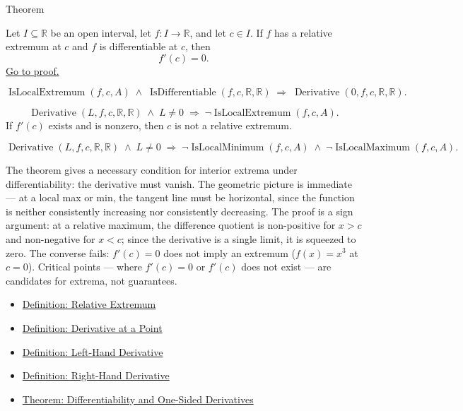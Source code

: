 
\begin{theorembox}{Theorem}
\begin{theorem}
\label{thm:interior-extremum-theorem}
Let $I \subseteq \mathbb{R}$ be an open interval, let $f : I \to \mathbb{R}$, and let $c \in I$.
If $f$ has a relative extremum at $c$ and $f$ is differentiable at $c$, then
\[
f'(c) = 0.
\]
\hyperref[prf:interior-extremum-theorem]{Go to proof.}
\end{theorem}
\end{theorembox}

\begin{remark*}
\[
\operatorname{IsLocalExtremum}(f,c,A) \;\land\; \operatorname{IsDifferentiable}(f,c,\mathbb{R},\mathbb{R})
\;\Rightarrow\; \operatorname{Derivative}(0,f,c,\mathbb{R},\mathbb{R}).
\]
\end{remark*}

\begin{remark*}[Interpretation]
\[
\operatorname{Derivative}(L,f,c,\mathbb{R},\mathbb{R}) \;\land\; L \neq 0
\;\Rightarrow\; \lnot\operatorname{IsLocalExtremum}(f,c,A).
\]
If $f'(c)$ exists and is nonzero, then $c$ is not a relative extremum.


\[
\operatorname{Derivative}(L,f,c,\mathbb{R},\mathbb{R}) \;\land\; L \neq 0
\;\Rightarrow\;
\lnot\operatorname{IsLocalMinimum}(f,c,A) \;\land\; \lnot\operatorname{IsLocalMaximum}(f,c,A).
\]


The theorem gives a necessary condition for interior extrema under differentiability: the derivative must vanish. The geometric picture is immediate --- at a local max or min, the tangent line must be horizontal, since the function is neither consistently increasing nor consistently decreasing. The proof is a sign argument: at a relative maximum, the difference quotient is non-positive for $x > c$ and non-negative for $x < c$; since the derivative is a single limit, it is squeezed to zero. The converse fails: $f'(c) = 0$ does not imply an extremum ($f(x) = x^3$ at $c = 0$). Critical points --- where $f'(c) = 0$ or $f'(c)$ does not exist --- are candidates for extrema, not guarantees.
\end{remark*}

\begin{dependencies}
\begin{itemize}
  \item \hyperref[def:relative-extremum]{Definition: Relative Extremum}
  \item \hyperref[def:derivative-at-a-point]{Definition: Derivative at a Point}
  \item \hyperref[def:left-hand-derivative]{Definition: Left-Hand Derivative}
  \item \hyperref[def:right-hand-derivative]{Definition: Right-Hand Derivative}
  \item \hyperref[thm:differentiability-and-one-sided-derivatives]{Theorem: Differentiability and One-Sided Derivatives}
\end{itemize}
\end{dependencies}

